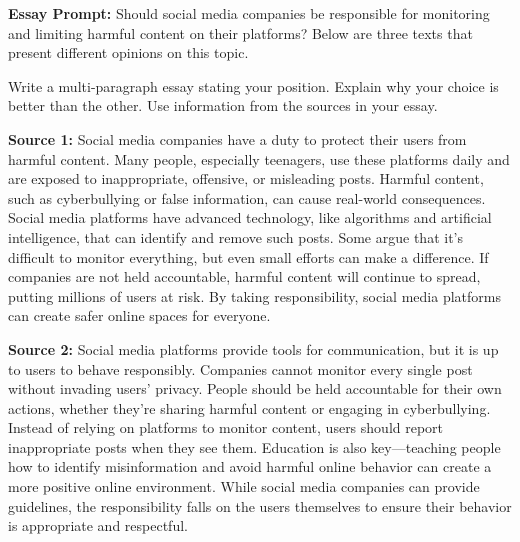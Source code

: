 \documentclass[12pt]{article}
\begin{document}
\begin{tcolorbox}[colframe=black!60, colback=white, 
coltitle=black, colbacktitle=black!15, fonttitle=\bfseries\Large, 
title=Independent Practice, halign title=center, left=10pt, right=10pt, top=10pt, bottom=15pt]
\textbf{Essay Prompt:}
Should social media companies be responsible for monitoring and limiting harmful content on their platforms?  Below are three texts that present different opinions on this topic.  

 

\vspace{1em}

Write a multi-paragraph essay stating your position. Explain why your choice is better than the other. Use information from the sources in your essay.

\vspace{1em}


\textbf{Source 1:} Social media companies have a duty to protect their users from harmful content. Many people, especially teenagers, use these platforms daily and are exposed to inappropriate, offensive, or misleading posts. Harmful content, such as cyberbullying or false information, can cause real-world consequences. Social media platforms have advanced technology, like algorithms and artificial intelligence, that can identify and remove such posts. Some argue that it’s difficult to monitor everything, but even small efforts can make a difference. If companies are not held accountable, harmful content will continue to spread, putting millions of users at risk. By taking responsibility, social media platforms can create safer online spaces for everyone. 

 


\vspace{1em}

\textbf{Source 2:} Social media platforms provide tools for communication, but it is up to users to behave responsibly. Companies cannot monitor every single post without invading users' privacy. People should be held accountable for their own actions, whether they’re sharing harmful content or engaging in cyberbullying. Instead of relying on platforms to monitor content, users should report inappropriate posts when they see them. Education is also key—teaching people how to identify misinformation and avoid harmful online behavior can create a more positive online environment. While social media companies can provide guidelines, the responsibility falls on the users themselves to ensure their behavior is appropriate and respectful. 
 

\end{tcolorbox}
\end{document}
